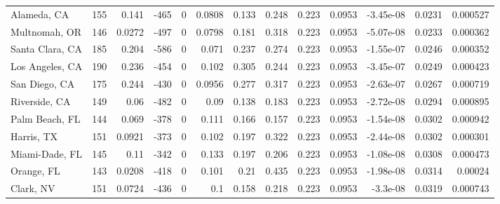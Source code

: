 \documentclass[12pt,letterpaper]{article}
\begin{document}
\begin{appendices}
\begin{sidewaystable}
{\begin{tabular}{lrrrrrrrrrrrr}
 Alameda, CA        & 155   & 0.141   & -465   &     0 &          0.0808 &            0.133 &         0.248  &        0.223 &       0.0953 &        -3.45e-08 &           0.0231  &        0.000527 \\
 Multnomah, OR      & 146   & 0.0272  & -497   &     0 &          0.0798 &            0.181 &         0.318  &        0.223 &       0.0953 &        -5.07e-08 &           0.0233  &        0.000362 \\
 Santa Clara, CA    & 185   & 0.204   & -586   &     0 &          0.071  &            0.237 &         0.274  &        0.223 &       0.0953 &        -1.55e-07 &           0.0246  &        0.000352 \\
 Los Angeles, CA    & 190   & 0.236   & -454   &     0 &          0.102  &            0.305 &         0.244  &        0.223 &       0.0953 &        -3.45e-07 &           0.0249  &        0.000423 \\
 San Diego, CA      & 175   & 0.244   & -430   &     0 &          0.0956 &            0.277 &         0.317  &        0.223 &       0.0953 &        -2.63e-07 &           0.0267  &        0.000719 \\
 Riverside, CA      & 149   & 0.06    & -482   &     0 &          0.09   &            0.138 &         0.183  &        0.223 &       0.0953 &        -2.72e-08 &           0.0294  &        0.000895 \\
 Palm Beach, FL     & 144   & 0.069   & -378   &     0 &          0.111  &            0.166 &         0.157  &        0.223 &       0.0953 &        -1.54e-08 &           0.0302  &        0.000942 \\
 Harris, TX         & 151   & 0.0921  & -373   &     0 &          0.102  &            0.197 &         0.322  &        0.223 &       0.0953 &        -2.44e-08 &           0.0302  &        0.000301 \\
 Miami-Dade, FL     & 145   & 0.11    & -342   &     0 &          0.133  &            0.197 &         0.206  &        0.223 &       0.0953 &        -1.08e-08 &           0.0308  &        0.000473 \\
 Orange, FL         & 143   & 0.0208  & -418   &     0 &          0.101  &            0.21  &         0.435  &        0.223 &       0.0953 &        -1.98e-08 &           0.0314  &        0.00024  \\
 Clark, NV          & 151   & 0.0724  & -436   &     0 &          0.1    &            0.158 &         0.218  &        0.223 &       0.0953 &        -3.3e-08  &           0.0319  &        0.000743 \\

\end{tabular}}
\end{sidewaystable}
\end{appendices}
\end{document}
